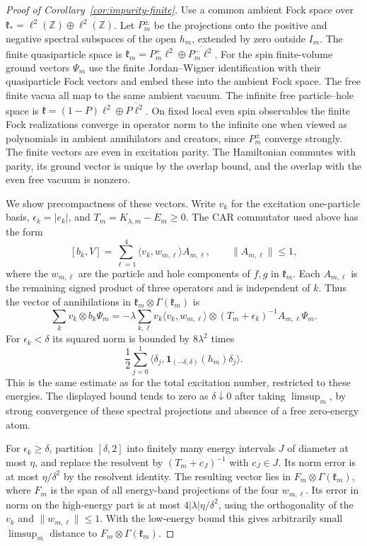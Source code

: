 \begin{proof}[Proof of Corollary~\ref{cor:impurity-finite}]
Use a common ambient Fock space over
$\mathfrak k_* = \ell^2(\mathbb Z)\oplus\overline{\ell^2(\mathbb Z)}$.
Let $P_m^\pm$ be the projections onto the positive and negative spectral
subspaces of the open $h_m$, extended by zero outside $I_m$. The finite
quasiparticle space is
$\mathfrak k_m=P_m^+\ell^2\oplus\overline{P_m^-\ell^2}$.
For the spin finite-volume ground vectors $\Psi_m$ use the finite
Jordan--Wigner identification with their quasiparticle Fock vectors and
embed these into the ambient Fock space. The free finite vacua all map to
the same ambient vacuum. The infinite free particle--hole space is
$\mathfrak k=(1-P)\ell^2\oplus\overline{P\ell^2}$. On fixed local even
spin observables the finite Fock realizations converge in operator norm
to the infinite one when viewed as polynomials in ambient annihilators
and creators, since $P_m^\pm$ converge strongly. The finite vectors are
even in excitation parity. The Hamiltonian commutes with parity, its
ground vector is unique by the overlap bound, and the overlap with the
even free vacuum is nonzero.

We show precompactness of these vectors. Write $v_k$ for the excitation
one-particle basis, $\epsilon_k=|e_k|$, and $T_m=K_{\lambda,m}-E_m\geq0$.
The CAR commutator used above has the form
\[
 [b_k,V]=\sum_{\ell=1}^4\langle v_k,w_{m,\ell}\rangle A_{m,\ell},
 \qquad \|A_{m,\ell}\|\leq 1,
\]
where the $w_{m,\ell}$ are the particle and hole components of $f,g$
in $\mathfrak k_m$. Each $A_{m,\ell}$ is the remaining signed product of
three operators and is independent of $k$. Thus the vector of annihilations
in $\mathfrak k_m\otimes\Gamma(\mathfrak k_m)$ is
\[
 \sum_k v_k\otimes b_k\Psi_m
 =-\lambda\sum_{k,\ell} v_k\langle v_k,w_{m,\ell}\rangle\otimes
     (T_m+\epsilon_k)^{-1}A_{m,\ell}\Psi_m .
\]
For $\epsilon_k<\delta$ its squared norm is bounded by
$8\lambda^2$ times
\[
 \frac12\sum_{j=0}^1
 \big\langle\delta_j,\mathbf1_{(-\delta,\delta)}(h_m)\delta_j\big\rangle.
\]
This is the same estimate as for the total excitation number, restricted
to these energies. The displayed bound tends to zero as $\delta\downarrow0$
after taking $\limsup_m$, by strong convergence of these spectral
projections and absence of a free zero-energy atom.

For $\epsilon_k\geq\delta$, partition $[\delta,2]$ into finitely many energy
intervals $J$ of diameter at most $\eta$, and replace the resolvent by
$(T_m+c_J)^{-1}$ with $c_J\in J$. Its norm error is at most $\eta/\delta^2$
by the resolvent identity. The resulting vector lies in
$F_m\otimes\Gamma(\mathfrak k_m)$, where $F_m$ is the span of all energy-band
projections of the four $w_{m,\ell}$. Its error in norm on the high-energy
part is at most $4|\lambda|\eta/\delta^2$, using the orthogonality of the
$v_k$ and $\|w_{m,\ell}\|\leq1$. With the low-energy bound this gives
arbitrarily small $\limsup_m$ distance to $F_m\otimes\Gamma(\mathfrak k_m)$.


\end{proof}
